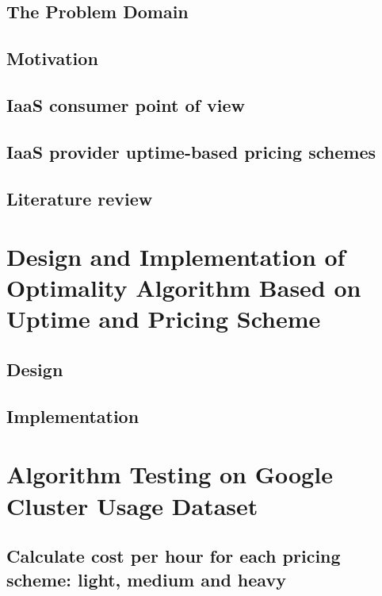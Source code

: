 \documentclass[]{final_report}
\begin{document}
\section{The Problem Domain}

\section{Motivation}

\section{IaaS consumer point of view}

\section{IaaS provider uptime-based pricing schemes}

\section{Literature review}



\chapter{Design and Implementation of Optimality Algorithm Based on Uptime and Pricing Scheme}

\section{Design}

\section{Implementation}


\chapter{Algorithm Testing on Google Cluster Usage Dataset}

\section{Calculate cost per hour for each pricing scheme: light, medium and heavy}
\end{document}
